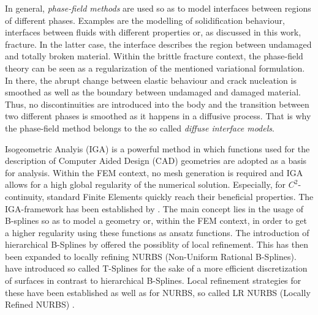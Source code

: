 In general, \textit{phase-field methods} are used so as to model interfaces between regions of different phases. Examples are the modelling of solidification behaviour, interfaces between fluids with different properties or, as discussed in this work, fracture. In the latter case, the interface describes the region between undamaged and totally broken material. Within the brittle fracture context, the phase-field theory can be seen as a regularization of the mentioned variational formulation. In there, the abrupt change between elastic behaviour and crack nucleation is smoothed as well as the boundary between undamaged and damaged material. Thus, no discontinuities are introduced into the body and the transition between two different phases is smoothed as it happens in a diffusive process. That is why the phase-field method belongs to the so called \textit{diffuse interface models}.

Isogeometric Analyis (IGA) is a powerful method in which functions used for the description of Computer Aided Design (CAD) geometries are adopted as a basis for analysis. Within the FEM context, no mesh generation is required and IGA allows for a high global regularity of the numerical solution. Especially, for $C^{2}$-continuity, standard Finite Elements quickly reach their beneficial properties. The IGA-framework has been established by \citet{09_B_IGA1}. The main concept lies in the usage of B-splines so as to model a geometry or, within the FEM context, in order to get a higher regularity using these functions as ansatz functions. The introduction of hierarchical B-Splines by \citet{18_IGA_HierBSplines} offered the possiblity of local refinement. This has then been expanded to locally refining NURBS (Non-Uniform Rational B-Splines). \citet{16_IGA_TSplines} have introduced so called T-Splines for the sake of a more efficient discretization of surfaces in contrast to hierarchical B-Splines. Local refinement strategies for these have been established as well as for NURBS, so called LR NURBS (Locally Refined NURBS) \cite{17_IGA_LRNURBS}.

